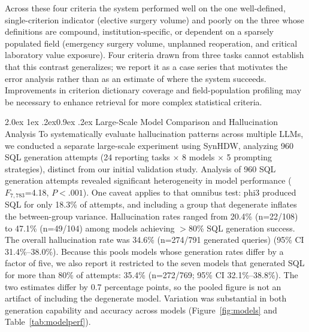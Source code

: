 \documentclass[10pt]{article}
\makeatletter
\renewcommand\subsection{\@startsection{subsection}{2}{\z@}%
  {2.0ex \@plus 1ex \@minus .2ex}{0.9ex \@plus .2ex}%
  {\normalfont\normalsize\bfseries}}
\makeatother
\begin{document}
Across these four criteria the system performed well on the one well-defined, single-criterion indicator (elective surgery volume) and poorly on the three whose definitions are compound, institution-specific, or dependent on a sparsely populated field (emergency surgery volume, unplanned reoperation, and critical laboratory value exposure). Four criteria drawn from three tasks cannot establish that this contrast generalizes; we report it as a case series that motivates the error analysis rather than as an estimate of where the system succeeds. Improvements
in criterion dictionary coverage and field-population profiling may be necessary
to enhance retrieval for more complex statistical criteria.

\subsection{Large-Scale Model Comparison and Hallucination Analysis}
To systematically evaluate hallucination patterns across multiple LLMs, we
conducted a separate large-scale experiment using SynHDW, analyzing 960 SQL
generation attempts (24 reporting tasks $\times$ 8 models $\times$ 5 prompting
strategies), distinct from our initial validation study. Analysis of 960 SQL generation attempts revealed significant heterogeneity in model performance ($F_{7,783}$=4.18, $P<.001$). One caveat applies to that omnibus test: phi3 produced SQL for only 18.3\% of attempts, and including a group that degenerate inflates the between-group variance. Hallucination rates ranged from 20.4\%
(n=22/108) to 47.1\% (n=49/104) among models achieving $>$80\% SQL generation
success. The overall hallucination rate was 34.6\% (n=274/791 generated queries) (95\% CI 31.4\%--38.0\%). Because this pools models whose generation rates differ by a factor of five, we also report it restricted to the seven models that generated SQL for more than 80\% of attempts: 35.4\% (n=272/769; 95\% CI 32.1\%--38.8\%). The two estimates differ by 0.7 percentage points, so the pooled figure is not an artifact of including the degenerate model. Variation was substantial in both generation capability and accuracy across models
(Figure~\ref{fig:models} and Table~\ref{tab:modelperf}).
\end{document}
